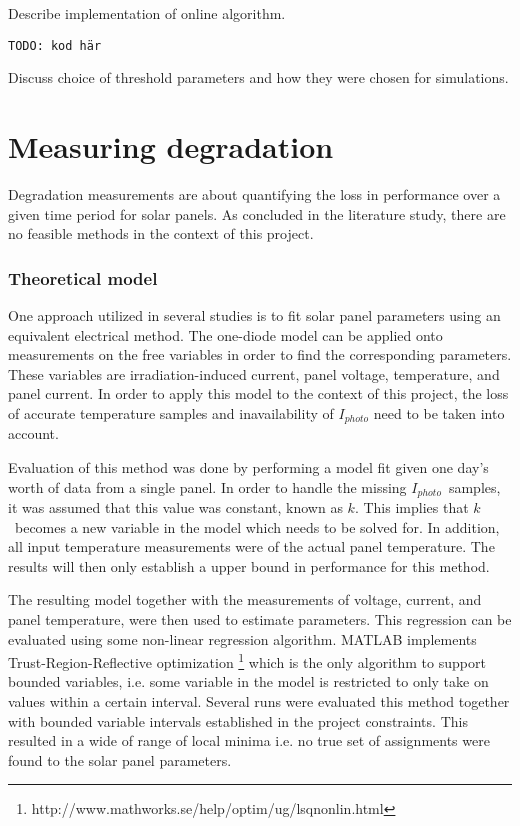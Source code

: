 Describe implementation of online algorithm.

\begin{verbatim}
TODO: kod här
\end{verbatim}

Discuss choice of threshold parameters and how they were chosen for simulations.

\section{Measuring degradation}
Degradation measurements are about quantifying the loss in performance over a given time period for solar panels.
As concluded in the literature study, there are no feasible methods in the context of this project.

\subsubsection{Theoretical model}
One approach utilized in several studies is to fit solar panel parameters using an equivalent electrical method.
The one-diode model can be applied onto measurements on the free variables in order to find the corresponding parameters.
These variables are irradiation-induced current, panel voltage, temperature, and panel current.
In order to apply this model to the context of this project, the loss of accurate temperature samples and inavailability of
$I_{photo}$ need to be taken into account.

Evaluation of this method was done by performing a model fit given one day's worth of data from a single panel.
In order to handle the missing $I_{photo}$ samples, it was assumed that this value was constant, known as $k$.
This implies that $k$ becomes a new variable in the model which needs to be solved for.
In addition, all input temperature measurements were of the actual panel temperature.
The results will then only establish a upper bound in performance for this method.

The resulting model together with the measurements of voltage, current, and panel temperature, were then used to estimate parameters.
This regression can be evaluated using some non-linear regression algorithm.
MATLAB implements Trust-Region-Reflective optimization \footnote{http://www.mathworks.se/help/optim/ug/lsqnonlin.html} which is the only algorithm to support bounded variables, i.e. some variable in the model is restricted to only take on values within a certain interval.
Several runs were evaluated this method together with bounded variable intervals established in the project constraints.
This resulted in a wide of range of local minima i.e. no true set of assignments were found to the solar panel parameters.

